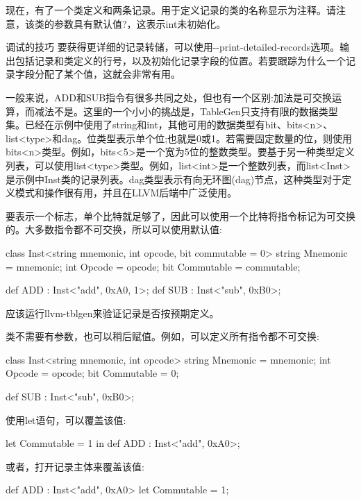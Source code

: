 现在，有了一个类定义和两条记录。用于定义记录的类的名称显示为注释。请注意，该类的参数具有默认值?，这表示int未初始化。

\begin{myTip}{调试的技巧}
要获得更详细的记录转储，可以使用-{}-print-detailed-records选项。输出包括记录和类定义的行号，以及初始化记录字段的位置。若要跟踪为什么一个记录字段分配了某个值，这就会非常有用。
\end{myTip}

一般来说，ADD和SUB指令有很多共同之处，但也有一个区别:加法是可交换运算，而减法不是。这里的一个小小的挑战是，TableGen只支持有限的数据类型集。已经在示例中使用了string和int，其他可用的数据类型有bit、bits<n>、list<type>和dag。位类型表示单个位;也就是0或1。若需要固定数量的位，则使用bits<n>类型。例如，bits<5>是一个宽为5位的整数类型。要基于另一种类型定义列表，可以使用list<type>类型。例如，list<int>是一个整数列表，而list<Inst>是示例中Inst类的记录列表。dag类型表示有向无环图(dag)节点，这种类型对于定义模式和操作很有用，并且在LLVM后端中广泛使用。

要表示一个标志，单个比特就足够了，因此可以使用一个比特将指令标记为可交换的。大多数指令都不可交换，所以可以使用默认值:

\begin{shell}
class Inst<string mnemonic, int opcode, bit commutable = 0> {
    string Mnemonic = mnemonic;
    int Opcode = opcode;
    bit Commutable = commutable;
}

def ADD : Inst<"add", 0xA0, 1>;
def SUB : Inst<"sub", 0xB0>;
\end{shell}

应该运行llvm-tblgen来验证记录是否按预期定义。

类不需要有参数，也可以稍后赋值。例如，可以定义所有指令都不可交换:

\begin{shell}
class Inst<string mnemonic, int opcode> {
    string Mnemonic = mnemonic;
    int Opcode = opcode;
    bit Commutable = 0;
}

def SUB : Inst<"sub", 0xB0>;
\end{shell}

使用let语句，可以覆盖该值:

\begin{shell}
let Commutable = 1 in
    def ADD : Inst<"add", 0xA0>;
\end{shell}

或者，打开记录主体来覆盖该值:

\begin{shell}
def ADD : Inst<"add", 0xA0> {
    let Commutable = 1;
}
\end{shell}


